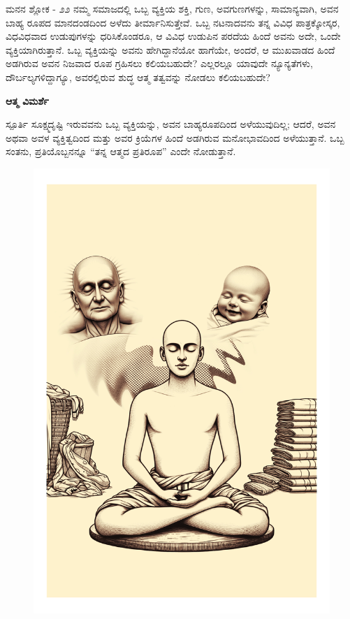 \begin{mananam}{\mananamfont \large ಮನನ ಶ್ಲೋಕ - ೨೨}
\footnotesize \mananamtext ನಮ್ಮ ಸಮಾಜದಲ್ಲಿ ಒಬ್ಬ ವ್ಯಕ್ತಿಯ ಶಕ್ತಿ, ಗುಣ, ಅವಗುಣಗಳನ್ನು, ಸಾಮಾನ್ಯವಾಗಿ, ಅವನ ಬಾಹ್ಯ ರೂಪದ ಮಾನದಂಡದಿಂದ ಅಳೆದು ತೀರ್ಮಾನಿಸುತ್ತೇವೆ. ಒಬ್ಬ ನಟನಾದವನು ತನ್ನ ವಿವಿಧ ಪಾತ್ರಕ್ಕೋಸ್ಕರ, ವಿಧವಿಧವಾದ ಉಡುಪುಗಳನ್ನು ಧರಿಸಿಕೊಂಡರೂ, ಆ ವಿವಿಧ ಉಡುಪಿನ ಪರದೆಯ ಹಿಂದೆ ಅವನು ಅದೇ, ಒಂದೇ ವ್ಯಕ್ತಿಯಾಗಿರುತ್ತಾನೆ. ಒಬ್ಬ ವ್ಯಕ್ತಿಯನ್ನು ಅವನು ಹೇಗಿದ್ದಾನೆಯೋ ಹಾಗೆಯೇ, ಅಂದರೆ,  ಆ ಮುಖವಾಡದ ಹಿಂದೆ ಅಡಗಿರುವ ಅವನ ನಿಜವಾದ ರೂಪ ಗ್ರಹಿಸಲು ಕಲಿಯಬಹುದೇ? ಎಲ್ಲರಲ್ಲೂ ಯಾವುದೇ ನ್ಯೂನ್ಯತೆಗಳು, ದೌರ್ಬಲ್ಯಗಳಿದ್ದಾಗ್ಯೂ, ಅವರಲ್ಲಿರುವ ಶುದ್ಧ ಆತ್ಮ ತತ್ವವನ್ನು ನೋಡಲು ಕಲಿಯಬಹುದೇ?
\end{mananam}
\WritingHand\enspace\textbf{ಆತ್ಮ ವಿಮರ್ಶೆ}
\begin{inspiration}{\mananamfont \large ಸ್ಪೂರ್ತಿ}
\footnotesize \mananamtext ಸೂಕ್ಷ್ಮದೃಷ್ಟಿ ಇರುವವನು ಒಬ್ಬ ವ್ಯಕ್ತಿಯನ್ನು, ಅವನ ಬಾಹ್ಯರೂಪದಿಂದ ಅಳೆಯುವುದಿಲ್ಲ;  ಆದರೆ, ಅವನ ಅಥವಾ ಅವಳ ವ್ಯಕ್ತಿತ್ವದಿಂದ ಮತ್ತು  ಅವರ ಕ್ರಿಯೆಗಳ ಹಿಂದೆ ಅಡಗಿರುವ  ಮನೋಭಾವದಿಂದ ಅಳೆಯುತ್ತಾನೆ. ಒಬ್ಬ ಸಂತನು, ಪ್ರತಿಯೊಬ್ಬನನ್ನೂ “ತನ್ನ ಆತ್ಮದ ಪ್ರತಿರೂಪ” ಎಂದೇ ನೋಡುತ್ತಾನೆ.
\end{inspiration}
\newpage

\thispagestyle{empty}
\begin{figure}
\centering
\includegraphics[width=\paperwidth, height=\paperheight, keepaspectratio]{../images/002.jpg}
\end{figure}
\restoregeometry %
\newpage

